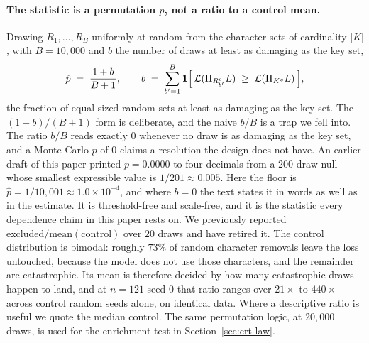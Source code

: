 \paragraph{The statistic is a permutation $p$, not a ratio to a control mean.} Drawing
$R_{1}, \dots, R_{B}$ uniformly at random from the character sets of cardinality $|K|$, with
$B = 10{,}000$ and $b$ the number of draws at least as damaging as the key set,
\begin{equation}
  \label{eq:permp}
  \hat{p} \;=\; \frac{1 + b}{B + 1},
  \qquad
  b \;=\; \sum_{b'=1}^{B}
  \mathbf{1}\Bigl[\, \mathcal{L}(\Pi_{R_{b'}^{c}} L) \;\ge\; \mathcal{L}(\Pi_{K^{c}} L) \,\Bigr],
\end{equation}
the fraction of equal-sized random sets at least as damaging as the key set.
The $(1+b)/(B+1)$ form \citep{phipson2010permutation} is deliberate, and the naive $b/B$ is a trap we fell into. The
ratio $b/B$ reads exactly $0$ whenever no draw is as damaging as the key set, and a Monte-Carlo
$p$ of $0$ claims a resolution the design does not have. An earlier draft of this paper
printed $p = 0.0000$ to four decimals from a $200$-draw null whose smallest expressible
value is $1/201 \approx 0.005$. Here the floor is $\hat{p} = 1/10{,}001 \approx 1.0 \times
10^{-4}$, and where $b = 0$ the text states it in words as well as in the estimate. It is
threshold-free and scale-free, and it is the statistic every dependence claim in this paper
rests on. We previously reported
$\text{excluded} / \text{mean}(\text{control})$ over $20$ draws and have retired it. The
control distribution is bimodal: roughly $73\%$ of random character removals leave the loss
untouched, because the model does not use those characters, and the remainder are
catastrophic. Its mean is therefore decided by how many catastrophic draws happen to land, and
at $n = 121$ seed $0$ that ratio ranges over $21\times$ to $440\times$ across control random
seeds alone, on identical data. Where a descriptive ratio is useful we quote the median
control. The same permutation logic, at $20{,}000$ draws, is used for the enrichment test in
Section~\ref{sec:crt-law}.

